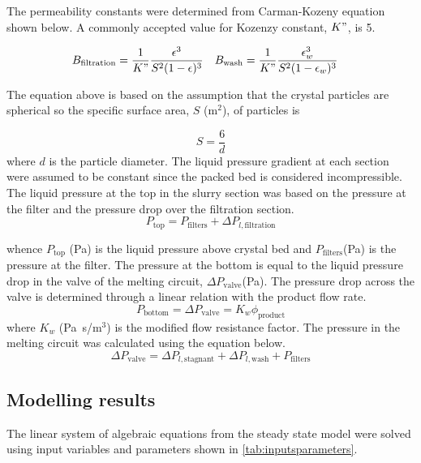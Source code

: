The permeability constants were determined  from Carman-Kozeny equation shown below. A commonly accepted value for Kozenzy constant, $K"$, is 5.

\begin{align}
   B_{\mathrm{filtration}} &= \frac{1}{K"}\frac{\epsilon^3}{S^2(1-\epsilon)^3} &
   B_{\mathrm{wash}} &= \frac{1}{K"}\frac{\epsilon_w^3}{S^2(1-\epsilon_w)^3}
\end{align}

The equation above is based on the assumption that the crystal particles are spherical so the specific surface area, $S$ (m$^2$), of particles is 

\begin{equation}
S = \frac{6}{d}
\end{equation}
\noindent where $d$ is the particle diameter. The liquid pressure gradient at each section were assumed to be constant since the packed bed is considered incompressible. The liquid pressure at the top in the slurry section was based on the pressure at the filter and the pressure drop over the filtration section. 
\begin{equation}
P_{\mathrm{top}} = P_{\mathrm{filters}} + \Delta P_{l,\mathrm{filtration}}
\end{equation}

\noindent whence $P_{\mathrm{top}}$ (Pa) is the liquid pressure above crystal bed and $P_{\mathrm{filters}} $(Pa) is the pressure at the filter. The pressure at the bottom is equal to the liquid pressure drop in the valve of the melting circuit, $\Delta P_{\mathrm{valve}} $(Pa). The pressure drop across the valve is determined through a linear relation with the product flow rate.
\begin{equation}
P_{\mathrm{bottom}}=\Delta P_{\mathrm{valve}} = K_w\phi_{\mathrm{product}}
\end{equation}
\noindent where $K_w$ (Pa~s/m$^3$) is the modified flow resistance factor. The pressure in the melting circuit was calculated using the equation below. 
\begin{equation}
\Delta P_{\mathrm{valve}} = \Delta P_{l,\mathrm{stagnant}} + \Delta P_{l,\mathrm{wash}} + P_{\mathrm{filters}}
\end{equation}

\subsection{Modelling results}
The linear system of algebraic equations from the steady state model were solved using input variables and parameters shown in \cref{tab:inputsparameters}. 

